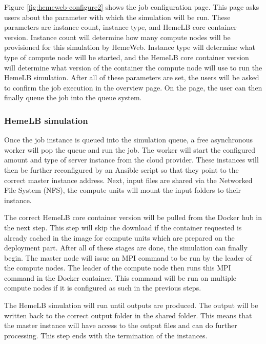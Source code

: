 \vspace{1cm}

Figure \ref{fig:hemeweb-configure2} shows the job configuration page. This page asks users about the parameter with which the simulation will be run. These parameters are instance count, instance type, and HemeLB core container version. Instance count will determine how many compute nodes will be provisioned for this simulation by HemeWeb. Instance type will determine what type of compute node will be started, and the HemeLB core container version will determine what version of the container the compute node will use to run the HemeLB simulation. After all of these parameters are set, the users will be asked to confirm the job execution in the overview page. On the page, the user can then finally queue the job into the queue system.



\subsubsection{HemeLB simulation}

Once the job instance is queued into the simulation queue, a free asynchronous worker will pop the queue and run the job. The worker will start the configured amount and type of server instance from the cloud provider. These instances will then be further reconfigured by an Ansible script so that they point to the correct master instance address. Next, input files are shared via the Networked File System (NFS), the compute units will mount the input folders to their instance. 

The correct HemeLB core container version will be pulled from the Docker hub in the next step. This step will skip the download if the container requested is already cached in the image for compute units which are prepared on the deployment part. After all of these stages are done, the simulation can finally begin. The master node will issue an MPI command to be run by the leader of the compute nodes. The leader of the compute node then runs this MPI command in the Docker container. This command will be run on multiple compute nodes if it is configured as such in the previous steps. 

The HemeLB simulation will run until outputs are produced. The output will be written back to the correct output folder in the shared folder. This means that the master instance will have access to the output files and can do further processing. This step ends with the termination of the instances.

